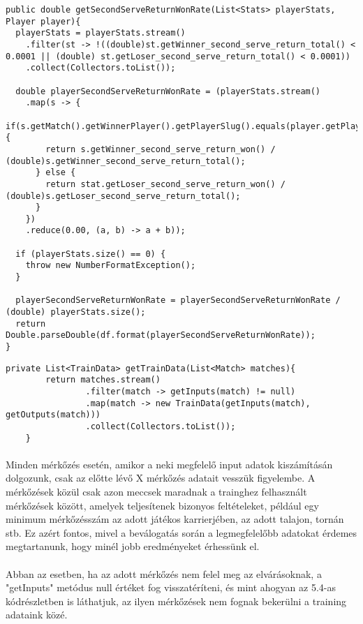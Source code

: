 \begin{lstlisting}[caption= A második adogatások utáni pontok győzelmi rátája fogadóként]
public double getSecondServeReturnWonRate(List<Stats> playerStats, Player player){
  playerStats = playerStats.stream()
    .filter(st -> !((double)st.getWinner_second_serve_return_total() < 0.0001 || (double) st.getLoser_second_serve_return_total() < 0.0001))
    .collect(Collectors.toList());

  double playerSecondServeReturnWonRate = (playerStats.stream()
    .map(s -> {
      if(s.getMatch().getWinnerPlayer().getPlayerSlug().equals(player.getPlayerSlug())){
        return s.getWinner_second_serve_return_won() / (double)s.getWinner_second_serve_return_total();
      } else {
        return stat.getLoser_second_serve_return_won() / (double)s.getLoser_second_serve_return_total();
      }
    })
    .reduce(0.00, (a, b) -> a + b));

  if (playerStats.size() == 0) {
    throw new NumberFormatException();
  }

  playerSecondServeReturnWonRate = playerSecondServeReturnWonRate / (double) playerStats.size();
  return Double.parseDouble(df.format(playerSecondServeReturnWonRate));
}
\end{lstlisting}

\begin{lstlisting}[caption= Az adatbázisban talált mérkőzések training adatokká való átalakítása]
    private List<TrainData> getTrainData(List<Match> matches){
        return matches.stream()
                .filter(match -> getInputs(match) != null)
                .map(match -> new TrainData(getInputs(match), getOutputs(match)))
                .collect(Collectors.toList());
    }
\end{lstlisting}

\paragraph{}
Minden mérkőzés esetén, amikor a neki megfelelő input adatok kiszámításán dolgozunk, csak az előtte lévő X mérkőzés adatait vesszük figyelembe. A mérkőzések közül csak azon meccsek maradnak a trainghez felhasznált mérkőzések között, amelyek teljesítenek bizonyos feltételeket, például egy minimum mérkőzésszám az adott játékos karrierjében, az adott talajon, tornán stb. Ez azért fontos, mivel a beválogatás során a legmegfelelőbb adatokat érdemes megtartanunk, hogy minél jobb eredményeket érhessünk el.

\paragraph{}
Abban az esetben, ha az adott mérkőzés nem felel meg az elvárásoknak, a "getInputs" metódus null értéket fog visszatéríteni, és mint ahogyan az 5.4-as kódrészletben is láthatjuk, az ilyen mérkőzések nem fognak bekerülni a training adataink közé.

